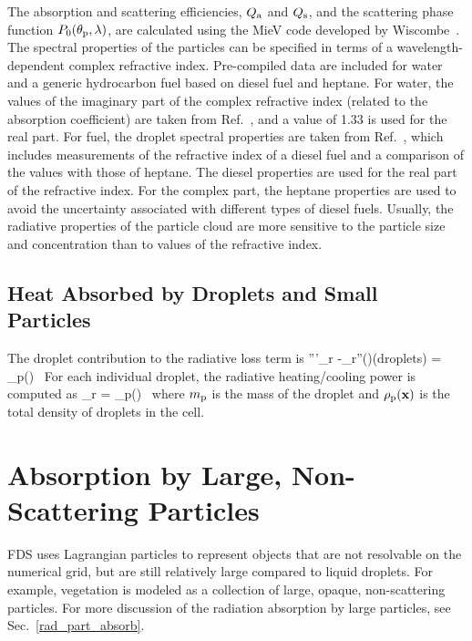 The absorption and scattering efficiencies, $Q_{\rm a}$ and $Q_{\rm s}$, and the scattering phase function $P_0(\theta_{\rm p},\lambda)$, are calculated using the MieV code developed by Wiscombe~\cite{Wiscombe}. The spectral properties of the particles can be specified in terms of a wavelength-dependent complex refractive index. Pre-compiled data are included for water and a generic hydrocarbon fuel based on diesel fuel and heptane. For water, the values of the imaginary part of the complex refractive index (related to the absorption coefficient) are taken from Ref.~\cite{Hale:1}, and a value of 1.33 is used for the real part. For fuel, the droplet spectral properties are taken from Ref.~\cite{Dombrovsky:1}, which includes measurements of the refractive index of a diesel fuel and a comparison of the values with those of heptane. The diesel properties are used for the real part of the refractive index. For the complex part, the heptane properties are used to avoid the uncertainty associated with different types of diesel fuels. Usually, the radiative properties of the particle cloud are more sensitive to the particle size and concentration than to values of the refractive index.



\subsection{Heat Absorbed by Droplets and Small Particles}

The droplet contribution to the radiative loss term is
\be {}'''_{\rm r} \equiv -\nabla\!\cdot \dbq_{\rm r}''(\bx)(\mbox{droplets}) =
    \kappa_{\rm p}(\bx) \, \left[ U(\bx) - 4 \pi \, I_{{\rm b,p}}(\bx) \right]
\ee
For each individual droplet, the radiative heating/cooling power is computed as
\be
\dq_{\rm r} = 
    \kappa_{\rm p}(\bx) \, \left[ U(\bx) - 4\pi \, I_{{\rm b,p}}(\bx) \right]
\ee
where $m_{\rm p}$ is the mass of the droplet and $\rho_{\rm p}({\mathbf{x}})$ is the total density of droplets in the cell.



\section{Absorption by Large, Non-Scattering Particles}

FDS uses Lagrangian particles to represent objects that are not resolvable on the numerical grid, but are still relatively large compared to liquid droplets. For example, vegetation is modeled as a collection of large, opaque, non-scattering particles. For more discussion of the radiation absorption by large particles, see Sec.~\ref{rad_part_absorb}.








